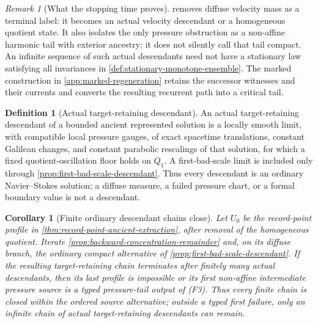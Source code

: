 \documentclass[11pt]{amsart}
\numberwithin{equation}{section}
\theoremstyle{plain}
\newtheorem{corollary}[corollary]{Corollary}
\theoremstyle{definition}
\newtheorem{definition}[definition]{Definition}
\theoremstyle{remark}
\newtheorem{remark}[remark]{Remark}
\begin{document}
\begin{remark}[What the stopping time proves]
\label{rem:first-bad-scale-scope}
 removes diffuse velocity mass as a
terminal label: it becomes an actual velocity descendant or a homogeneous
quotient state.  It also isolates the only pressure obstruction as a
non-affine harmonic tail with exterior ancestry; it does not silently call
that tail compact.
An infinite sequence of such actual descendants need not have a stationary
law satisfying all invariances in
\cref{def:stationary-monotone-ensemble}.  The marked construction in
\cref{app:marked-regeneration} retains the successor witnesses and their
currents and converts the resulting recurrent path into a critical tail.
\end{remark}

\begin{definition}[Actual target-retaining descendant]
\label{def:actual-target-descendant}
An actual target-retaining descendant of a bounded ancient represented
solution is a locally smooth limit, with compatible local pressure gauges, of
exact spacetime translations, constant Galilean changes, and constant
parabolic rescalings of that solution, for which a fixed quotient-oscillation
floor holds on \(Q_1\).  A first-bad-scale limit is included only through
\cref{prop:first-bad-scale-descendant}.  Thus every descendant is an ordinary
Navier--Stokes solution; a diffuse measure, a failed pressure chart, or a
formal boundary value is not a descendant.
\end{definition}

\begin{corollary}[Finite ordinary descendant chains close]
\label{cor:finite-descendant-chains-close}
Let \(U_0\) be the record-point profile in
\cref{thm:record-point-ancient-extraction}, after removal of the homogeneous
quotient.  Iterate \cref{prop:backward-concentration-remainder} and, on its
diffuse branch, the ordinary compact alternative of
\cref{prop:first-bad-scale-descendant}.  If the resulting target-retaining
chain terminates after finitely many actual descendants, then its last profile
is impossible or its first non-affine intermediate pressure source is a
typed pressure-tail output of \textup{(F3)}.  Thus every finite chain is
closed within the ordered source alternative; outside a typed first failure,
only an infinite chain of actual target-retaining descendants can remain.
\end{corollary}
\end{document}
